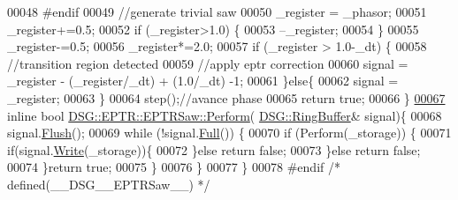 \begin{DoxyCode}
00048 \textcolor{preprocessor}{#endif}
00049             \textcolor{comment}{//generate trivial saw}
00050             \_register = \_phasor;
00051             \_register+=0.5;
00052             \textcolor{keywordflow}{if} (\_register>1.0) \{
00053                 --\_register;
00054             \}
00055             \_register-=0.5;
00056             \_register*=2.0;
00057             \textcolor{keywordflow}{if} (\_register > 1.0-\_dt) \{
00058                 \textcolor{comment}{//transition region detected}
00059                 \textcolor{comment}{//apply eptr correction}
00060                 signal = \_register - (\_register/\_dt) + (1.0/\_dt) -1;
00061             \}\textcolor{keywordflow}{else}\{
00062                 signal = \_register;
00063             \}
00064             step();\textcolor{comment}{//avance phase}
00065             \textcolor{keywordflow}{return} \textcolor{keyword}{true};
00066         \}
\hypertarget{_e_p_t_r_saw_8h_source_l00067}{}\hyperlink{class_d_s_g_1_1_e_p_t_r_1_1_e_p_t_r_saw_a9dbefaeeb74e30e722bb5d8ea767cdca}{00067}         \textcolor{keyword}{inline} \textcolor{keywordtype}{bool} \hyperlink{class_d_s_g_1_1_e_p_t_r_1_1_e_p_t_r_saw_aa253efa41cca56f334ccb0fd32c2cd56}{DSG::EPTR::EPTRSaw::Perform}(
      \hyperlink{class_d_s_g_1_1_ring_buffer}{DSG::RingBuffer}& signal)\{
00068             signal.\hyperlink{class_d_s_g_1_1_ring_buffer_ab23c8003d2857809a816068eeb209d60}{Flush}();
00069             \textcolor{keywordflow}{while} (!signal.\hyperlink{class_d_s_g_1_1_ring_buffer_a53ddb04ffcbb5470a8d2b0a3c65b70cb}{Full}()) \{
00070                 \textcolor{keywordflow}{if} (Perform(\_storage)) \{
00071                     \textcolor{keywordflow}{if}(signal.\hyperlink{class_d_s_g_1_1_ring_buffer_aa5dd2caa0a270173251faee40a43d692}{Write}(\_storage))\{
00072                     \}\textcolor{keywordflow}{else} \textcolor{keywordflow}{return} \textcolor{keyword}{false};
00073                 \}\textcolor{keywordflow}{else} \textcolor{keywordflow}{return} \textcolor{keyword}{false};
00074             \}\textcolor{keywordflow}{return} \textcolor{keyword}{true};
00075         \}
00076     \}
00077 \}
00078 \textcolor{preprocessor}{#endif }\textcolor{comment}{/* defined(\_\_DSG\_\_EPTRSaw\_\_) */}\textcolor{preprocessor}{}
\end{DoxyCode}
